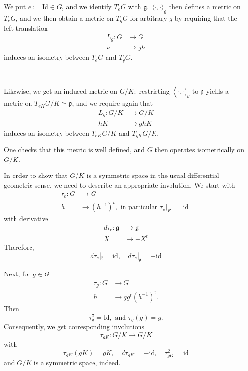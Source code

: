 	We put $e:=\mathrm{Id} \in G$, and we identify $T_{e} G$ with
	$\mathfrak{g} .\ \ \langle\cdot, \cdot\rangle_{\mathfrak{g}}$
	then defines a metric on $T_{e} G$, and we then obtain a
	metric on $T_{g} G$ for arbitrary $g$ by requiring that the
	left translation
	\[
	\begin{aligned}
		L_{g}: G & \rightarrow G \\
		h & \rightarrow g h
	\end{aligned}
	\]
	induces an isometry between $T_{e} G$ and $T_{g} G$. 
	
	\
	
	Likewise, we get an induced metric on $G / K:$ restricting
	$\left\langle\cdot,  \cdot\rangle_{g}\right.$ to $\mathfrak
	p$ yields a metric on $T_{e K} G / K \simeq \mathfrak{p}$,
	and we require again
	that
	\[
	\begin{aligned}
		L_{g}: G / K & \rightarrow G / K \\
		h K & \rightarrow g h K
	\end{aligned}
	\]
	induces an isometry between $T_{e K} G / K$ and $T_{g K} G /
	K$.

	One checks that this metric is well defined, and $G$ then
	operates isometrically on $G / K$.
	
	In order to show that $G / K$ is a symmetric space in the
	usual differential geometric sense, we need to describe an
	appropriate involution. We start with
	\[
	\begin{aligned}
		\tau_{e}: G & \rightarrow G \\
		h & \rightarrow\left(h^{-1}\right)^{t}, \text { in
		particular } \tau_{e }|_K=\text { id }
	\end{aligned}
	\]
	with derivative
	\[
	\begin{aligned}
		d\tau_{e}: \mathfrak g & \rightarrow \mathfrak g \\
		X & \rightarrow-X^{t}
	\end{aligned}
	\]
	Therefore,
	\[
	d \tau_{e}|_{\mathfrak k}=\mathrm{id}, \quad d \tau_{e
	}|_{\mathfrak{p}}=-\mathrm{id}
	\]
	

	Next, for $g \in G$
	\[
	\begin{aligned}
		\tau_{g}: G & \rightarrow G \\ h & \rightarrow g
		g^{t}\left(h^{-1}\right)^{t} .
	\end{aligned}
	\]
	Then
	\[
	\tau_{g}^{2}=\mathrm{Id}, \text { and } \tau_{g}(g)=g .
	\]
	Consequently, we get corresponding involutions
	\[
	\tau_{g K}: G / K \rightarrow G / K
	\]
	with
	\[
	\tau_{g K}(g K)=g K, \quad d \tau_{g K}=-\mathrm{id}, \quad
	\tau_{g K}^{2}=\mathrm{id}
	\]
	and $G / K$ is a symmetric space, indeed.

